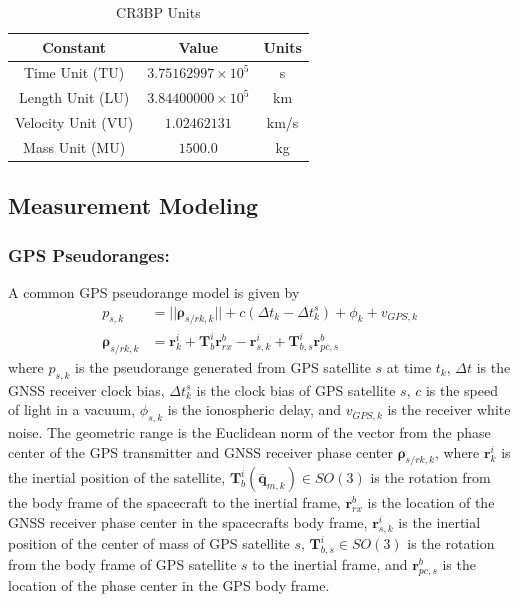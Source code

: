 \documentclass[letterpaper, paper,11pt]{AAS}		%
\begin{document}
\begin{table}[]
	\centering
	\caption{CR3BP Units}
	\label{tab:const_params}
	\begin{tabular}{ccc}
		\hline
		\hline
		Constant             & Value                     & Units           \\ 
		\hline
		Time Unit (TU)       & $3.75162997\times10^{5}$  & s               \\
		Length Unit (LU)     & $3.84400000\times10^{5}$  & km              \\
		Velocity Unit (VU)      & $1.02462131$              & km/s            \\
		Mass Unit (MU)       & $1500.0$                  & kg              \\
		\hline \hline
	\end{tabular}
\end{table}

\subsection{Measurement Modeling}\label{ssec:measmodeling}
\subsubsection{GPS Pseudoranges:}
A common GPS pseudorange model is given by \cite{Tapley_2004, Craft_2020}
\begin{align}
	p_{s,k} &= ||\boldsymbol{\rho}_{s/rk,k}|| + c(\Delta t_k - \Delta t_k^s) + \phi_k + v_{GPS,k} \\
	\boldsymbol{\rho}_{s/rk,k} &= \mathbf{r}_k^i + \mathbf{T}_b^i\mathbf{r}_{rx}^b - \mathbf{r}_{s,k}^i + \mathbf{T}_{b,s}^i\mathbf{r}_{pc,s}^b
\end{align}
where $p_{s,k}$ is the pseudorange generated from GPS satellite $s$ at time $t_k$, $\Delta t$ is the GNSS receiver clock bias, $\Delta t_k^s$ is the clock bias of GPS satellite $s$, $c$ is the speed of light in a vacuum, $\phi_{s,k}$ is the ionospheric delay, and $v_{GPS,k}$ is the receiver white noise. The geometric range is the Euclidean norm of the vector from the phase center of the GPS transmitter and GNSS receiver phase center $\boldsymbol{\rho}_{s/rk,k}$, where $\mathbf{r}_k^i$ is the inertial position of the satellite, $\mathbf{T}_b^i(\bar{\mathbf{q}}_{m,k}) \in SO(3)$ is the rotation from the body frame of the spacecraft to the inertial frame, $\mathbf{r}_{rx}^b$ is the location of the GNSS receiver phase center in the spacecrafts body frame, $\mathbf{r}_{s,k}^i$ is the inertial position of the center of mass of GPS satellite $s$, $\mathbf{T}_{b,s}^i\in SO(3)$ is the rotation from the body frame of GPS satellite $s$ to the inertial frame, and $\mathbf{r}_{pc,s}^b$ is the location of the phase center in the GPS body frame.
\end{document}
